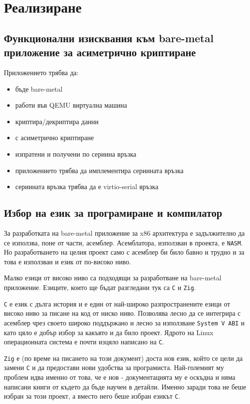 \chapter{Реализиране} %
\section{Функционални изисквания към bare-metal приложение за асиметрично криптиране}
Приложението трябва да:
\begin{itemize}
  \item бъде bare-metal
  \item работи във QEMU виртуална машина
  \item криптира/декриптира данни
  \item с асиметрично криптиране
  \item изпратени и получени по сериина връзка
  \item приложението трябва да имплементира сериината връзка
  \item сериината връзка трябва да е virtio-serial връзка
\end{itemize}

\section{Избор на език за програмиране и компилатор}
За разработката на bare-metal приложение за x86 архитектура е задължително да се използва, поне от части, асемблер. Асемблатора, използван в проекта, е {\tt NASM}. Но разработването на целия проект само с асемблер би било бавно и трудно и за това е използван и език от по-високо ниво.

Малко езици от високо ниво са подходящи за разработване на bare-metal приложение. Езиците, които ще бъдат разгледани тук са {\tt C} и {\tt Zig}.

{\tt C} е език с дълга история и е един от най-широко разпространените езици от високо ниво за писане на код от ниско ниво. Позволява лесно да се интегрира с асемблер чрез своето широко поддържано и лесно за използване {\tt System V ABI}\parencite{sysvabi} и като цяло е добър избор за какъвто и да било проект. Ядрото на Linux операционната система е почти изцяло написано на {\tt C}.

{\tt Zig} е (по време на писането на този документ) доста нов език, който се цели да замени {\tt C} и да предостави нови удобства за програмиста\parencite{whyzig}. Най-големият му проблем идва именно от това, че е нов - документацията му е оскъдна и няма написани книги от където да бъде научен в детайли. Именно заради това не беше избран за този проект, а вместо него беше избран езикът {\tt C}.

